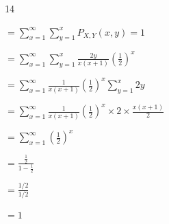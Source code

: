 \documentclass[12 pt]{article}
\begin{document}
    \begin{exercise}{14}
    \hfill

    $= \sum_{x=1}^{\infty} \sum_{y=1}^{x} P_{X,Y} (x,y) = 1$

    $= \sum_{x=1}^{\infty} \sum_{y=1}^{x} \frac{2y}{x(x+1)}(\frac{1}{2})^x$

    $= \sum_{x=1}^{\infty} \frac{1}{x(x+1)}(\frac{1}{2})^x \sum_{y=1}^{x} 2y$

    $= \sum_{x=1}^{\infty} \frac{1}{x(x+1)}(\frac{1}{2})^x \times 2 \times \frac{x(x+1)}{2}$

    $= \sum_{x=1}^{\infty} (\frac{1}{2})^x$

    $= \frac{\frac{1}{2}}{1 - \frac{1}{2}}$

    $= \frac{1/2}{1/2}$

    $= 1$

    \hfill
    \end{exercise}
    
\end{document}
